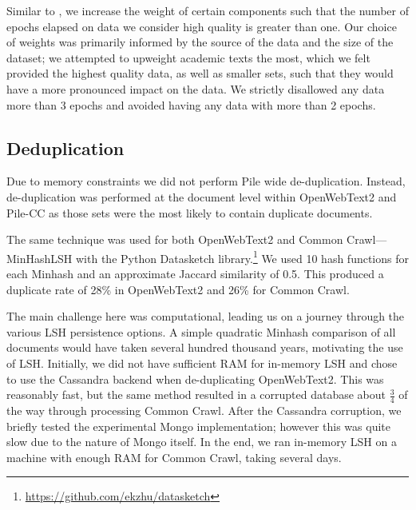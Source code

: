 \documentclass[11pt,a4paper]{article}
\begin{document}
\begin{appendices}
\begin{comment}
We felt that academic texts provided the highest quality data and therefore awarded it to be the largest category of the non-CC data. We assigned the rest of the categorical weights to provide equal to their proportion in the Pile, so that we wouldn't have a large amount of up-sampling (which would lead to over-training). We then assigned the proportions for each of the components within each category, with the similar rough heuristic of allowing for small (less than 2x) up-sampling. After this step we added the CC component to the Pile, which, as mentioned earlier, diluted the weights of each component.
\end{comment}

Similar to \citet{GPT3}, we increase the weight of certain components such that the number of epochs elapsed on data we consider high quality is greater than one. Our choice of weights was primarily informed by the source of the data and the size of the dataset; we attempted to upweight academic texts the most, which we felt provided the highest quality data, as well as smaller sets, such that they would have a more pronounced impact on the data. We strictly disallowed any data more than 3 epochs and avoided having any data with more than 2 epochs.



\subsection{Deduplication}\label{apdx:deduplication}


Due to memory constraints we did not perform Pile wide de-duplication. Instead, de-duplication was performed at the document level within OpenWebText2 and Pile-CC as those sets were the most likely to contain duplicate documents. 

The same technique was used for both OpenWebText2 and Common Crawl---MinHashLSH with the Python Datasketch library.\footnote{\url{https://github.com/ekzhu/datasketch}} We used 10 hash functions for each Minhash and an approximate Jaccard similarity of 0.5. This produced a duplicate rate of 28\% in OpenWebText2 and 26\% for Common Crawl.

The main challenge here was computational, leading us on a journey through the various LSH persistence options. A simple quadratic Minhash comparison of all documents would have taken several hundred thousand years, motivating the use of LSH. Initially, we did not have sufficient RAM for in-memory LSH and chose to use the Cassandra backend when de-duplicating OpenWebText2. This was reasonably fast, but the same method resulted in a corrupted database about $\frac{3}{4}$ of the way through processing Common Crawl. After the Cassandra corruption, we briefly tested the experimental Mongo implementation; however this was quite slow due to the nature of Mongo itself. In the end, we ran in-memory LSH on a machine with enough RAM for Common Crawl, taking several days.



\end{appendices}
\end{document}
